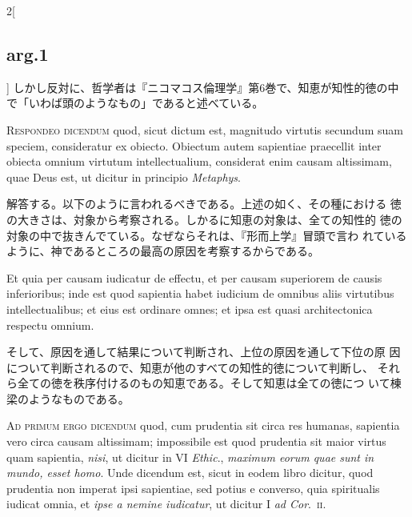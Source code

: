 \documentclass[paper=a4paper,fontsize=10pt,jafontsize=9pt,titlepage]{jlreq}
\begin{document}
\begin{paracol}{2}[\subsection{arg.1}]
しかし反対に、哲学者は『ニコマコス倫理学』第6巻で、知恵が知性的徳の中
 で「いわば頭のようなもの」であると述べている。


{\scshape Respondeo dicendum} quod, sicut dictum est, magnitudo
virtutis secundum suam speciem, consideratur ex obiecto. Obiectum
autem sapientiae praecellit inter obiecta omnium virtutum
intellectualium, considerat enim causam altissimam, quae Deus est, ut
 dicitur in principio {\itshape Metaphys}.

\switchcolumn

解答する。以下のように言われるべきである。上述の如く、その種における
 徳の大きさは、対象から考察される。しかるに知恵の対象は、全ての知性的
 徳の対象の中で抜きんでている。なぜならそれは、『形而上学』冒頭で言わ
 れているように、神であるところの最高の原因を考察するからである。

\switchcolumn*

Et quia per causam iudicatur
de effectu, et per causam superiorem de causis inferioribus; inde est
quod sapientia habet iudicium de omnibus aliis virtutibus
intellectualibus; et eius est ordinare omnes; et ipsa est quasi
architectonica respectu omnium.

\switchcolumn

そして、原因を通して結果について判断され、上位の原因を通して下位の原
 因について判断されるので、知恵が他のすべての知性的徳について判断し、
 それら全ての徳を秩序付けるのもの知恵である。そして知恵は全ての徳につ
 いて棟梁のようなものである。

\switchcolumn*[\subsection{ad.1}]

{\scshape Ad primum ergo dicendum} quod, cum prudentia sit circa res
humanas, sapientia vero circa causam altissimam; impossibile est quod
prudentia sit maior virtus quam sapientia, {\itshape nisi}, ut dicitur
in VI {\itshape Ethic}., {\itshape maximum eorum quae sunt in mundo,
esset homo}. Unde dicendum est, sicut in eodem libro dicitur, quod
prudentia non imperat ipsi sapientiae, sed potius e converso, quia
spiritualis iudicat omnia, et {\itshape ipse a nemine iudicatur}, ut
 dicitur I {\itshape ad Cor}.~{\scshape ii}.

\switchcolumn


\end{paracol}
\end{document}
